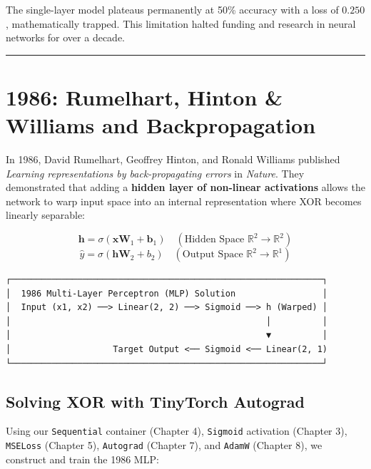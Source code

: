 \documentclass[
  letterpaper,
]{scrbook}
\begin{document}
The single-layer model plateaus permanently at 50\% accuracy with a loss
of \(0.250\), mathematically trapped. This limitation halted funding and
research in neural networks for over a decade.

\begin{center}\rule{0.5\linewidth}{0.5pt}\end{center}

\section*{1986: Rumelhart, Hinton \& Williams and
Backpropagation}\label{rumelhart-hinton-williams-and-backpropagation}


In 1986, David Rumelhart, Geoffrey Hinton, and Ronald Williams published
\emph{Learning representations by back-propagating errors} in
\emph{Nature}. They demonstrated that adding a \textbf{hidden layer of
non-linear activations} allows the network to warp input space into an
internal representation where XOR becomes linearly separable:

\[\mathbf{h} = \sigma(\mathbf{x} \mathbf{W}_1 + \mathbf{b}_1) \quad (\text{Hidden Space } \mathbb{R}^2 \to \mathbb{R}^2)\]
\[\hat{y} = \sigma(\mathbf{h} \mathbf{W}_2 + b_2) \quad (\text{Output Space } \mathbb{R}^2 \to \mathbb{R}^1)\]

\begin{verbatim}
┌─────────────────────────────────────────────────────────────┐
│  1986 Multi-Layer Perceptron (MLP) Solution                 │
│  Input (x1, x2) ──> Linear(2, 2) ──> Sigmoid ──> h (Warped) │
│                                                  │          │
│                                                  ▼          │
│                    Target Output <── Sigmoid <── Linear(2, 1)
└─────────────────────────────────────────────────────────────┘
\end{verbatim}

\subsection*{Solving XOR with TinyTorch
Autograd}\label{solving-xor-with-tinytorch-autograd}

Using our \texttt{Sequential} container (Chapter 4), \texttt{Sigmoid}
activation (Chapter 3), \texttt{MSELoss} (Chapter 5), \texttt{Autograd}
(Chapter 7), and \texttt{AdamW} (Chapter 8), we construct and train the
1986 MLP:
\end{document}
